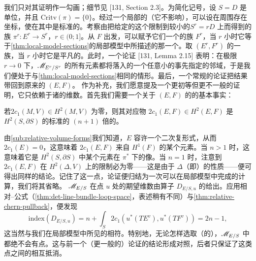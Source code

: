 我们只对其证明作一勾画；细节见 [131, Section 2.3]。为简化记号，设 $S=D$ 是单位\trDisk，并且 $\mathrm{Critv}(\pi)=\{0\}$。经过一个局部的\trDeformation（它不影响\trInvariant），可以设在\trCriticalPoint{}周围存在\trHolomorphic\trMorse{}坐标，使\trSymplecticForm{}在其中是标准的。考察由把给定的这个\trLefschetzFibration{}限制到较小的\trDisk{}$S^r=rD$ 上而得到的\trLefschetzFibration{}族 $\pi^r\colon E^r\to S^r$，$r\in(0;1]$。从 $F$ 出发，可以赋予它们一个\trSmooth{}的\trBoundaryCondition{}族 $F^r$，当 $r$ 小时它等于\cref{thm:local-model-sections}的局部模型中所描述的那一个。取 $(E^r,F^r)$ 的一族\trPerturbationDatum，当 $r$ 小时它是平凡的。此时，一个\trCompactness{}论证 [131, Lemma 2.15] 表明：在极限 $r\to0$ 下，$\mathscr{M}_{E^r/S^r}$ 的所有元素都将落入\trCriticalPoint{}的一个任意小的事先指定的邻域，于是我们便处于与\cref{thm:local-model-sections}相同的情形。最后，一个常规的\trCobordism{}论证把结果带回到原来的 $(E,F)$。
作为补充，我们愿意提及一个更初等但更不一般的证明，它只依赖于诸\trModuliSpace{}的维数。首先我们需要一个关于 $(E,F)$ 的\trTopology{}的基本事实：
\begin{lemma}\label{thm:relative-chern-pullback}
若\trRelative\trFirstChernClass{}$2c_1(M,V)\in H^2(M,V)$ 为零，则其对应物 $2c_1(E,F)\in H^2(E,F)$ 是 $H^2(S,\partial S)$ 的标准\trGenerator{}的 $(n+1)$ 倍的\trPullback。
\end{lemma}
由\cref{sub:relative-volume-forms}我们知道，$E$ 容许一个二次复\trVolume{}形式，从而 $2c_1(E)=0$，这意味着 $2c_1(E,F)$ 来自 $H^1(F)$ 的某个元素。当 $n>1$ 时，这意味着它是 $H^2(S,\partial S)$ 中某个元素在 $\pi^*$ 下的像。当 $n=1$ 时，注意到 $2c_1(E,F)$ 在 $H^2(\Delta,V)$ 上的限制必为零——这是由于 $\Delta$（即\trLefschetzThimble）的\trLagrange{}性质——便可得出同样的结论。记住了这一点，论证便归结为一次可以在局部模型中完成的计算，我们将其省略。
\trModuliSpace{}$\mathscr{M}_{E/S}$ 在点 $u$ 处的期望维数由算子 $D_{E/S,u}$ 的\trIndex{}给出。应用相对\trRiemann--\trRoch{}公式（\cref{thm:det-line-bundle-loop-space}，表述稍有不同）与\cref{thm:relative-chern-pullback}，便发现
\begin{equation*}
\mathrm{index}(D_{E/S,u})=n+\int_S2c_1(u^*(TE^v),u^*(TF^v))=2n-1,
\end{equation*}
这当然与我们在局部模型中所见的相符。特别地，无论怎样选取（\trRegular{}的）\trRelative\trPerturbationDatum，$\mathscr{M}_{E/S}$ 中都绝不会有\trIsolated{}点。这与前一个（更一般的）\trCobordism{}论证的结论形成对照，后者只保证了这类\trIsolated{}点之间的相互抵消。
